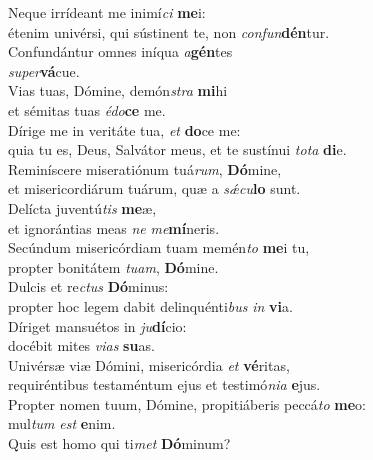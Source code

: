 \evenverse Neque irrídeant me inimí\textit{ci} \textbf{me}i:~\*\\
\evenverse étenim univérsi, qui sústinent te, non \textit{con}\textit{fun}\textbf{dén}tur.\\
\oddverse Confundántur omnes iníqua \textit{a}\textbf{gén}tes~\*\\
\oddverse \textit{su}\textit{per}\textbf{vá}cue.\\
\evenverse Vias tuas, Dómine, demón\textit{stra} \textbf{mi}hi~\*\\
\evenverse et sémitas tuas \textit{é}\textit{do}\textbf{ce} me.\\
\oddverse Dírige me in veritáte tua, \textit{et} \textbf{do}ce me:~\*\\
\oddverse quia tu es, Deus, Salvátor meus, et te sustínui \textit{to}\textit{ta} \textbf{di}e.\\
\evenverse Reminíscere miseratiónum tuá\textit{rum}, \textbf{Dó}mine,~\*\\
\evenverse et misericordiárum tuárum, quæ a \textit{sǽ}\textit{cu}\textbf{lo} sunt.\\
\oddverse Delícta juventú\textit{tis} \textbf{me}æ,~\*\\
\oddverse et ignorántias meas \textit{ne} \textit{me}\textbf{mí}neris.\\
\evenverse Secúndum misericórdiam tuam memén\textit{to} \textbf{me}i tu,~\*\\
\evenverse propter bonitátem \textit{tu}\textit{am}, \textbf{Dó}mine.\\
\oddverse Dulcis et re\textit{ctus} \textbf{Dó}minus:~\*\\
\oddverse propter hoc legem dabit delinquénti\textit{bus} \textit{in} \textbf{vi}a.\\
\evenverse Díriget mansuétos in \textit{ju}\textbf{dí}cio:~\*\\
\evenverse docébit mites \textit{vi}\textit{as} \textbf{su}as.\\
\oddverse Univérsæ viæ Dómini, misericórdia \textit{et} \textbf{vé}ritas,~\*\\
\oddverse requiréntibus testaméntum ejus et testimó\textit{ni}\textit{a} \textbf{e}jus.\\
\evenverse Propter nomen tuum, Dómine, propitiáberis peccá\textit{to} \textbf{me}o:~\*\\
\evenverse mul\textit{tum} \textit{est} \textbf{e}nim.\\
\oddverse Quis est homo qui ti\textit{met} \textbf{Dó}minum?~\*\\
